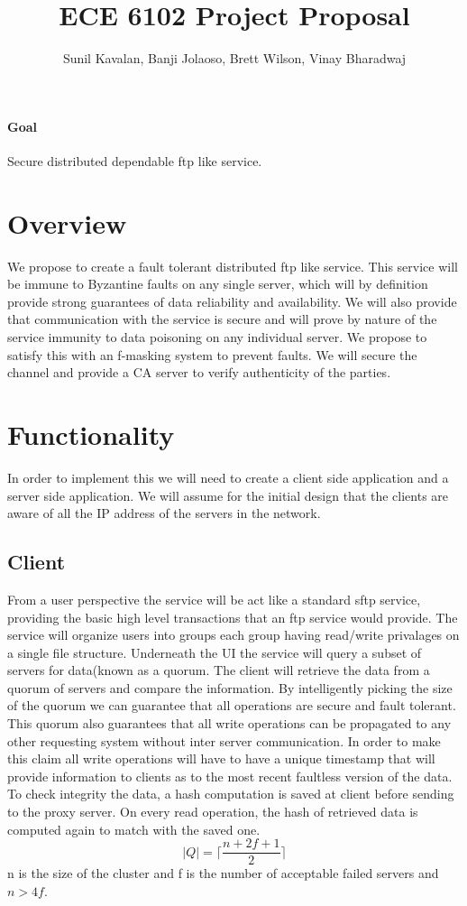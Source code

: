 \documentclass[11pt,a4paper,notitlepage,twocolumn]{report}
\author{Sunil Kavalan, Banji Jolaoso, Brett Wilson, Vinay Bharadwaj}
\title{ECE 6102 Project Proposal}
\begin{document}
\maketitle
\paragraph{Goal}
Secure distributed dependable ftp like service.

\section{Overview}
We propose to create a fault tolerant distributed ftp like service. This service will be immune to Byzantine faults on any single server, which will by definition provide strong guarantees of data reliability and availability. We will also provide that communication with the service is secure and will prove by nature of the service immunity to data poisoning on any individual server. We propose to satisfy this with an f-masking system to prevent faults. We will secure the channel and provide a CA server to verify authenticity of the parties.

\section{Functionality}

In order to implement this we will need to create a client side application and a server side application. We will assume for the initial design that the clients are aware of all the IP address of the servers in the network.

\subsection{Client}
From a user perspective the service will be act like a standard sftp service, providing the basic high level transactions that an ftp service would provide. The service will organize users into groups each group having read/write privalages on a single file structure. Underneath the UI the service will query a subset of servers for data(known as a quorum. The client will retrieve the data from a quorum of servers and compare the information. By intelligently picking the size of the quorum we can guarantee that all operations are secure and fault tolerant. This quorum also guarantees that all write operations can be propagated to any other requesting system without inter server communication. In order to make this claim all write operations will have to have a unique timestamp that will provide information to clients as to the most recent faultless version of the data. To check integrity the data, a hash computation is saved at client before sending to the proxy server.  On every read operation, the hash of retrieved data is computed again to match with the saved one.
\begin{equation}
|Q| = \lceil \frac{n + 2f + 1}{2}\rceil 
\end{equation}
n is the size of the cluster and f is the number of acceptable failed servers and $n > 4f$. 
\end{document}
